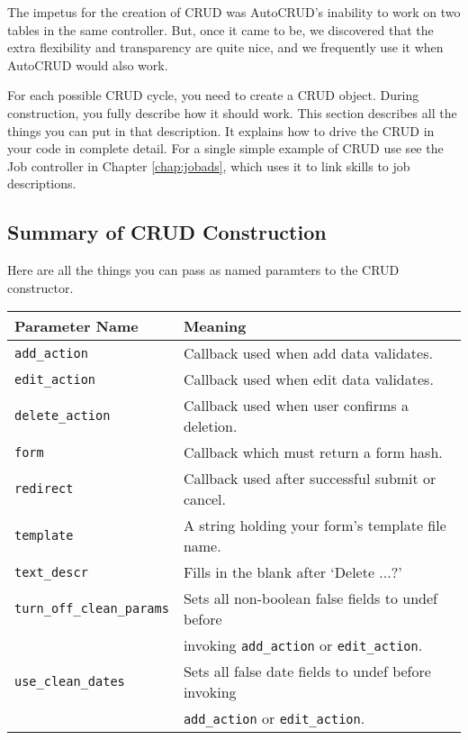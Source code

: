 The impetus for the creation of CRUD was AutoCRUD's inability to work on two
tables in the same controller.  But, once it came to be, we discovered that
the extra flexibility and transparency are quite nice, and we frequently use
it when AutoCRUD would also work.

For each possible CRUD cycle, you need to create a CRUD object.  During
construction, you fully describe how it should work.  This section describes
all the things you can put in that description.  It explains how
to drive the CRUD in your code in complete detail.  For a single simple
example of CRUD use see the Job controller in Chapter \ref{chap:jobads},
which uses it to link skills to job descriptions.

\subsection*{Summary of CRUD Construction}

Here are all the things you can pass as named paramters to the CRUD
constructor.

\begin{tabular}{l|l}
Parameter Name & Meaning \\
\hline
\verb+add_action+      & Callback used when add data validates.              \\
\verb+edit_action+     & Callback used when edit data validates.             \\
\verb+delete_action+   & Callback used when user confirms a deletion.        \\
\verb+form+            & Callback which must return a form hash.             \\
\verb+redirect+        & Callback used after successful submit or cancel.    \\
\verb+template+        & A string holding your form's template file name.    \\
\verb+text_descr+      & Fills in the blank after `Delete ...?'              \\
\verb+turn_off_clean_params+
                       & Sets all non-boolean false fields to undef before   \\
                       & invoking \verb+add_action+ or \verb+edit_action+.   \\
\verb+use_clean_dates+ & Sets all false date fields to undef before invoking \\
                       & \verb+add_action+ or \verb+edit_action+.            \\
\end{tabular}

